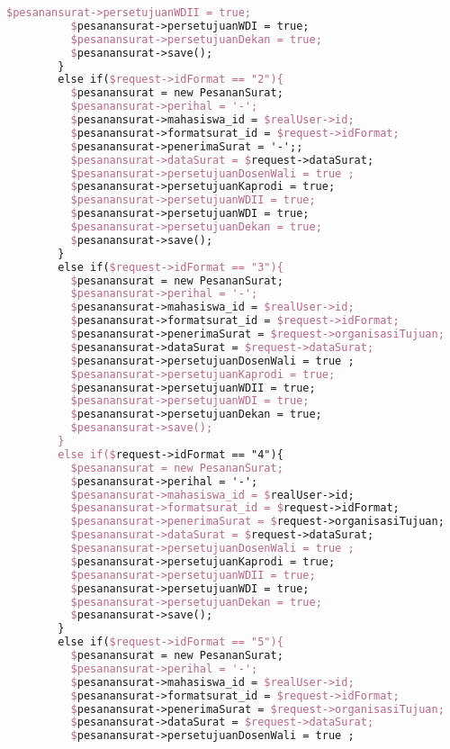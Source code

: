 \begin{lstlisting}[language=tex,basicstyle=\tiny,caption=PesanansuratController.php]
          $pesanansurat->persetujuanWDII = true;
          $pesanansurat->persetujuanWDI = true;
          $pesanansurat->persetujuanDekan = true;
          $pesanansurat->save();
        }
        else if($request->idFormat == "2"){
          $pesanansurat = new PesananSurat;
          $pesanansurat->perihal = '-';
          $pesanansurat->mahasiswa_id = $realUser->id;
          $pesanansurat->formatsurat_id = $request->idFormat;
          $pesanansurat->penerimaSurat = '-';;
          $pesanansurat->dataSurat = $request->dataSurat;
          $pesanansurat->persetujuanDosenWali = true ;
          $pesanansurat->persetujuanKaprodi = true;
          $pesanansurat->persetujuanWDII = true;
          $pesanansurat->persetujuanWDI = true;
          $pesanansurat->persetujuanDekan = true;
          $pesanansurat->save();
        }
        else if($request->idFormat == "3"){
          $pesanansurat = new PesananSurat;
          $pesanansurat->perihal = '-';
          $pesanansurat->mahasiswa_id = $realUser->id;
          $pesanansurat->formatsurat_id = $request->idFormat;
          $pesanansurat->penerimaSurat = $request->organisasiTujuan;
          $pesanansurat->dataSurat = $request->dataSurat;
          $pesanansurat->persetujuanDosenWali = true ;
          $pesanansurat->persetujuanKaprodi = true;
          $pesanansurat->persetujuanWDII = true;
          $pesanansurat->persetujuanWDI = true;
          $pesanansurat->persetujuanDekan = true;
          $pesanansurat->save();
        }
        else if($request->idFormat == "4"){
          $pesanansurat = new PesananSurat;
          $pesanansurat->perihal = '-';
          $pesanansurat->mahasiswa_id = $realUser->id;
          $pesanansurat->formatsurat_id = $request->idFormat;
          $pesanansurat->penerimaSurat = $request->organisasiTujuan;
          $pesanansurat->dataSurat = $request->dataSurat;
          $pesanansurat->persetujuanDosenWali = true ;
          $pesanansurat->persetujuanKaprodi = true;
          $pesanansurat->persetujuanWDII = true;
          $pesanansurat->persetujuanWDI = true;
          $pesanansurat->persetujuanDekan = true;
          $pesanansurat->save();
        }
        else if($request->idFormat == "5"){
          $pesanansurat = new PesananSurat;
          $pesanansurat->perihal = '-';
          $pesanansurat->mahasiswa_id = $realUser->id;
          $pesanansurat->formatsurat_id = $request->idFormat;
          $pesanansurat->penerimaSurat = $request->organisasiTujuan;
          $pesanansurat->dataSurat = $request->dataSurat;
          $pesanansurat->persetujuanDosenWali = true ;

\end{lstlisting}
